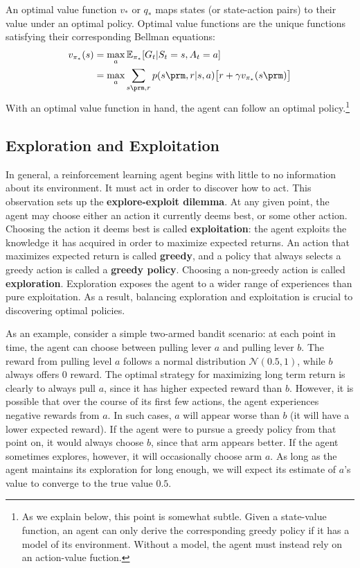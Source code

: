 \documentclass{my-tufte}
\begin{document}
An optimal value function $v_*$ or $q_*$ maps states (or state-action pairs) to their value under an optimal policy.
Optimal value functions are the unique functions satisfying their corresponding Bellman equations:
\begin{align*}
	v_{\pi_*}(s) &= \max_a \mathbb E_{\pi_*}[G_t | S_t = s, A_t = a]\\
							 &= \max_a \sum_{s\prm, r} p(s\prm, r | s, a) \big [ r + \gamma v_{\pi_*}(s\prm) \big ]
\end{align*}
With an optimal value function in hand, the agent can follow an optimal policy.\footnote{As we explain below, this point is somewhat subtle. Given a state-value function, an agent can only derive the corresponding greedy policy if it has a model of its environment. Without a model, the agent must instead rely on an action-value fuction.}

\subsection{Exploration and Exploitation}

In general, a reinforcement learning agent begins with little to no information about its environment.
It must act in order to discover how to act.
This observation sets up the \textbf{explore-exploit dilemma}.
At any given point, the agent may choose either an action it currently deems best, or some other action.
Choosing the action it deems best is called \textbf{exploitation}: the agent exploits the knowledge it has acquired in order to maximize expected returns.
An action that maximizes expected return is called \textbf{greedy}, and a policy that always selects a greedy action is called a \textbf{greedy policy}.
Choosing a non-greedy action is called \textbf{exploration}.
Exploration exposes the agent to a wider range of experiences than pure exploitation.
As a result, balancing exploration and exploitation is crucial to discovering optimal policies.

As an example, consider a simple two-armed bandit scenario: at each point in time, the agent can choose between pulling lever $a$ and pulling lever $b$.
The reward from pulling level $a$ follows a normal distribution $\mathcal N(0.5, 1)$, while $b$ always offers $0$ reward.
The optimal strategy for maximizing long term return is clearly to always pull $a$, since it has higher expected reward than $b$.
However, it is possible that over the course of its first few actions, the agent experiences negative rewards from $a$.
In such cases, $a$ will appear worse than $b$ (it will have a lower expected reward).
If the agent were to pursue a greedy policy from that point on, it would always choose $b$, since that arm appears better.
If the agent sometimes explores, however, it will occasionally choose arm $a$.
As long as the agent maintains its exploration for long enough, we will expect its estimate of $a$'s value to converge to the true value $0.5$.
\end{document}
